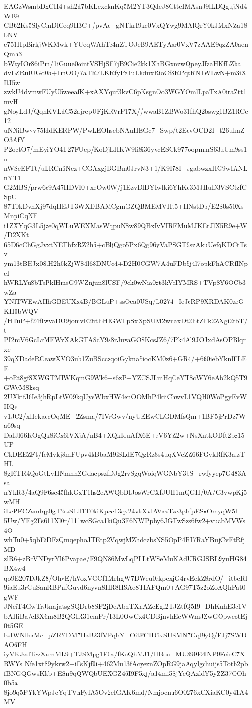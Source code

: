 EAGzWsmbDxCH4+sh2d7bKLexcknKq5M2YT3QdeJ8CtteIMAsnJ9lLDQgujNd4WB9
CB62Ks5SlyCmDlCeq9H3C+/pvAc+gNTkrI9kc0VxQYwg9MAlQrY0kJMxNZa18bNV
c751HpBirkjWKMwk+YUeqWAhTe4nZTOJeB9AETyAsr0VxV7zAAE9qzZA0aenQmh3
bWtyIOr86iPm/1iGuue0ointVSHjSF7jB9Cie2kk1XhBGxnzwQpeyJfzaHKfLZba
dvLZRuIUGd05+1mOO/7aTR7LKRfyPz1uLkduxRioCf8RPqtRN1WLwN+m3iXIlJ5w
zwkU4dvmwFUyU5weeafK+xAXYquf3kvC6pKsgnOo3WGYOmlLpaTxA0iraZtt1mvH
gNoyLdJ/QqnKVLdC52ajrepUFjKRVrP17X//wwaB1ZBWo31fhQ2bswg1BZ1RCc12
uNNiBwvv75lddKERPW/PwLEOhsebNAuHEGc7+Swp/t2EcvOCD2I+t26ulmZO3AfY
P2octO7/mEyiYO4T27FUep/KoDjLHKW9li8i36yvcESCk977oopmmS63uUm9ss1n
nWSeEFTt/uLRCn6Nez+CGAxgjBGBm0JrvN3+1/K9I78I+JgabwzxHG9wIANLnYT1
G2MBS/prw6e9A47HDVI0+xeOw0W/j1EzvDlDYIwlki6YhKc3MJHuD3VSCtzfCSpC
87T0kDvhXj97dqHEJT3WXDBAMCgmGZQBMEMVHt5+HNstDp/E2S0s50XsMnpiCqNF
i1ZXYqG3L5jze0qWLuWEXMasWqpuN8w89QBxIvVIRFMuMJKErJlX5R9e+W/D2XKt
65D6cChGgJvxtNEThfxRZ2h5+cBljQgo5Px6Qg96yVaPSGT9szAkuUefqKDCtTsv
ym13tBHJx08lH2h0kZjW84l68DNUc4+D2H0CGW7A4uFDb5j4l7opkFhACRfINpcI
hWRLYu8bTsPklHmsG9WZnjun8lUSF/9ck0wNia0zt3kVcIYMRS+TVp8Y6OCb3wZa
YNlTWEwAHhGBEUXx4B/BGLuP+ssOea0USq/L0274+IeJcRP9XRDAK0zeGKH0bWQV
/HTuP+f24fIwvaDO9jomvE2fitEHIGWLpSxXpSUM2wuaxDt2EtZFk2ZXgi2tbT/t
PI2rcV6GcLrMFWvXAkGTAScY9s8rJuvaGO8KcsJZ6/7Pk4Al9JOJxdAsOPBlqrxe
39qXDadeRCeawXVO3ub1ZuBScczqoiGykna5iocKM0z6+GR4/+660iebYknlFLEE
+oRt8gfSXWGTMIWKqmG9Wk6+s6zP+YZCSJLmHqCeYT8cWY6eAb2kQ5T9GWyMSksq
2UXkifJ6Ie3jhRpLtW09kqUyeWbxHW4enOOMhP4kiiChwvL1VQH0WoPgyEvWIIQs
v1JC2/xHekaccOqME+2Zsma/7IVrGwv/nyUEEwCLGDMfsQm+1BF5jPrDz7Wa69sq
DaIJl66KOgQk8iCx6lVXjA/nB4+XQkIouAfX6E+rV6YZ2w+NsXntkODft2bz15UP
CkDEEZFt/feMvkj8mFUpv4kBbaM9iSLdE7QgRz8s4uqXVeZZ66FGvkRfK3alzTHL
8gI6TR4QoGtLvHNmnhZGdacpszfDJg2rvSgqWoiqWGNbY3bS+rwfyyep7G483Asa
nYkR3/4aQ9F6sc45fhkGxT1hs2eAWQbDIJosWrCXfJUH1mQGH/0A/C3vwpKj5wMH
iLcPECZsndqp0gT2rsS1Jl1T0kiKpce13qv24vkXvlAVazTzc3pbfpESaOmyqW5I
5Uw/YEg2Fs611Xl0r/111wcSGca1kiQu3F6NWPpby6JGTwSzs6fw2+vuabMVWs4O
whTu0+5qbEiDFzQmqephoJTEtp2VqwjMZhdczbsNS5OpP4RI7RaYBujCvFtRfjMD
zlR6+zBrVNDyrYl6Pvapae/F9QN86MwLqPLLtWSeMuKAdURGJSBL9yuHG84BX4w4
qo9E207DJkZ8/OhvE/hVoxVGCf1MrhgW7DWeu0rkpexjG4rvEekZ8rdO/+itbeRl
9iaEu3rGuSanRBPnfGuvd6nyvn8HR8HSAe8TIAFQm0+AG97T5z2oZoAQhPat0gWF
JNeiT4GwTrJtnajatsgSQDrb8SF2jDeAbhTXnAZcEgl2TJZtfQ5I9+DhKuhE3e1V
bAHiBa/cBX6m8B2QGIR31cmPr/13L0OwCx4CDBjnvhEcWWmJZwGOpweotEj0t5GE
bsIWNlhaMe+pZRYDM7HzB23fVPqbY+OitFCID6xSUSMN7Gql9yQ/FJj7SWDAO6FH
iyVKJzdTczXumML9+TJSMpg1F0a/fKeQhMJ1/HBoo+MU899E4lNP9FeirC7XRWYs
Nfe1xt89ykrw2+iFsKjf0i+462Mu13fAcyeznZOpRG9jaAqylgchuijs5Totb2pb
fBNGQGwsKkb+ESn9qQWQbUEXGZ46I9F5xj/a14mi5SjYeQAzldY5yZZ37OOh0b5a
8jo9q5PYkYWpJcYqTVhFyfA5Ov2efGAK6md/Nmjocnu6O0276xCXiaKC0y41A4MV
